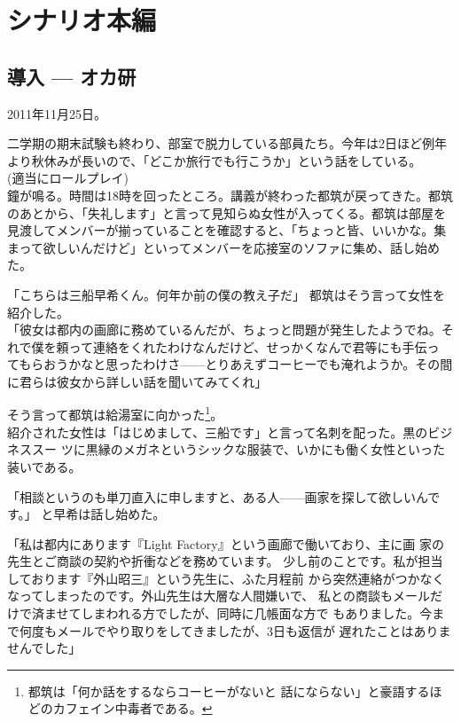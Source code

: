 \documentclass[a4paper,8pt,min]{jsarticle}
\begin{document}
\newpage
\section{シナリオ本編}
\subsection{導入 --- オカ研}
2011年11月25日。


二学期の期末試験も終わり、部室で脱力している部員たち。今年は2日ほど例年
より秋休みが長いので、「どこか旅行でも行こうか」という話をしている。\\

(適当にロールプレイ)\\


鐘が鳴る。時間は18時を回ったところ。講義が終わった都筑が戻ってきた。都筑
のあとから、「失礼します」と言って見知らぬ女性が入ってくる。都筑は部屋を
見渡してメンバーが揃っていることを確認すると、「ちょっと皆、いいかな。集
まって欲しいんだけど」といってメンバーを応接室のソファに集め、話し始めた。

「こちらは三船早希くん。何年か前の僕の教え子だ」
都筑はそう言って女性を紹介した。\\

「彼女は都内の画廊に務めているんだが、ちょっと問題が発生したようでね。そ
れで僕を頼って連絡をくれたわけなんだけど、せっかくなんで君等にも手伝っ
てもらおうかなと思ったわけさ------とりあえずコーヒーでも淹れようか。その間
に君らは彼女から詳しい話を聞いてみてくれ」


そう言って都筑は給湯室に向かった\footnote{都筑は「何か話をするならコーヒーがないと
話にならない」と豪語するほどのカフェイン中毒者である。}。\\


紹介された女性は「はじめまして、三船です」と言って名刺を配った。黒のビジネススー
ツに黒縁のメガネというシックな服装で、いかにも働く女性といった装いである。


「相談というのも単刀直入に申しますと、ある人------画家を探して欲しいんで
す。」
と早希は話し始めた。

「私は都内にあります『Light Factory』という画廊で働いており、主に画
家の先生とご商談の契約や折衝などを務めています。
少し前のことです。私が担当しております『外山昭三』という先生に、ふた月程前
から突然連絡がつかなくなってしまったのです。外山先生は大層な人間嫌いで、
私との商談もメールだけで済ませてしまわれる方でしたが、同時に几帳面な方で
もありました。今まで何度もメールでやり取りをしてきましたが、3日も返信が
遅れたことはありませんでした」
\end{document}

